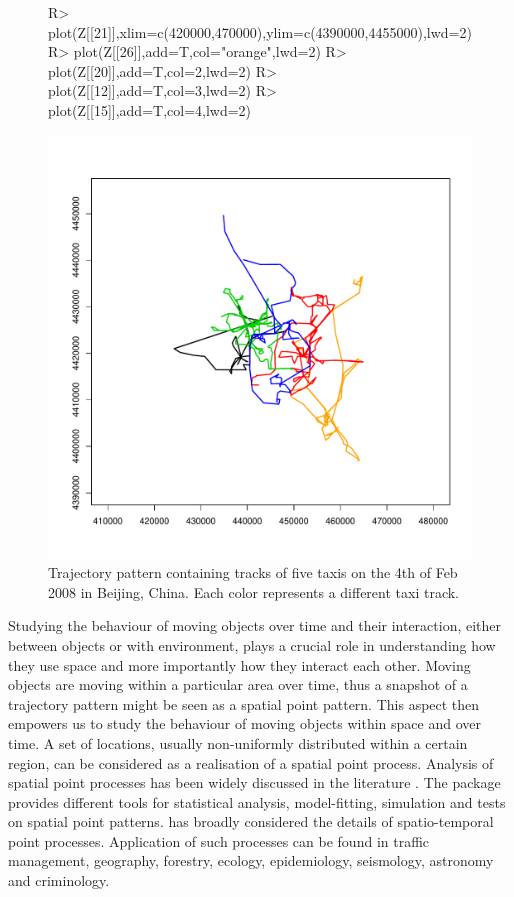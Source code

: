 \documentclass[article]{jss}
\begin{document}
\begin{figure}[htbp]
\begin{center}
\begin{Schunk}
\begin{Sinput}
R> plot(Z[[21]],xlim=c(420000,470000),ylim=c(4390000,4455000),lwd=2)
R> plot(Z[[26]],add=T,col="orange",lwd=2)
R> plot(Z[[20]],add=T,col=2,lwd=2)
R> plot(Z[[12]],add=T,col=3,lwd=2)
R> plot(Z[[15]],add=T,col=4,lwd=2)
\end{Sinput}
\end{Schunk}
\includegraphics{article-004}
\end{center}
\caption{Trajectory pattern containing tracks of five taxis on the 4th of Feb 2008 in Beijing, China. Each color represents a different taxi track.}
\label{taxitracks}
\end{figure}


Studying the behaviour of moving objects over time and their interaction, either between objects or with environment, plays a crucial role in understanding how they use space and more importantly how they interact each other. Moving objects are moving within a particular area over time, thus a snapshot of a trajectory pattern might be seen as a spatial point pattern. This aspect then empowers us to study the behaviour of moving objects within space and over time. A set of locations, usually non-uniformly distributed within a certain region, can be considered as a realisation of a spatial point process. Analysis of spatial point processes has been widely discussed in the literature \citep{MW03,IPSS08,D13,BRT15}. The  package  \citep{baddeley05,BRT15} provides different tools for statistical analysis, model-fitting, simulation and tests on spatial point patterns. \cite{D13} has broadly considered the details of spatio-temporal point processes. Application of such processes can be found in traffic management, geography, forestry, ecology, epidemiology, seismology, astronomy and criminology. 
\end{document}
